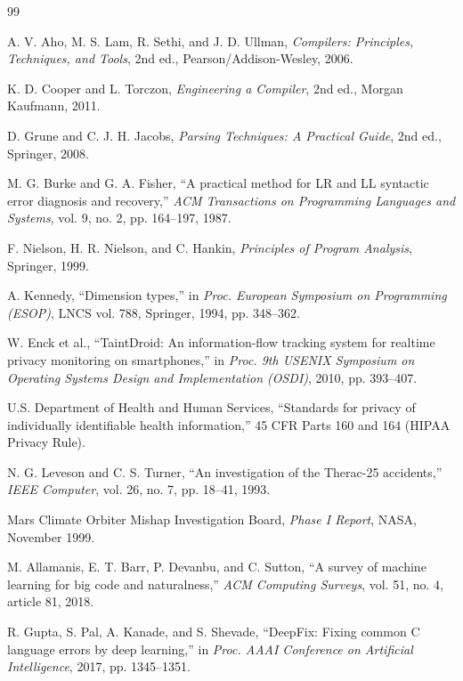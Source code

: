 \documentclass[12pt,a4paper]{article}
\begin{document}
\small
\begin{thebibliography}{99}
\setlength{\itemsep}{1pt}

A. V. Aho, M. S. Lam, R. Sethi, and J. D. Ullman,
\textit{Compilers: Principles, Techniques, and Tools},
2nd ed., Pearson/Addison-Wesley, 2006.

K. D. Cooper and L. Torczon,
\textit{Engineering a Compiler},
2nd ed., Morgan Kaufmann, 2011.

D. Grune and C. J. H. Jacobs,
\textit{Parsing Techniques: A Practical Guide},
2nd ed., Springer, 2008.

M. G. Burke and G. A. Fisher,
``A practical method for LR and LL syntactic error diagnosis and recovery,''
\textit{ACM Transactions on Programming Languages and Systems}, vol. 9, no. 2, pp. 164--197, 1987.

F. Nielson, H. R. Nielson, and C. Hankin,
\textit{Principles of Program Analysis},
Springer, 1999.

A. Kennedy,
``Dimension types,''
in \textit{Proc. European Symposium on Programming (ESOP)}, LNCS vol. 788, Springer, 1994, pp. 348--362.

W. Enck et al.,
``TaintDroid: An information-flow tracking system for realtime privacy monitoring on smartphones,''
in \textit{Proc. 9th USENIX Symposium on Operating Systems Design and Implementation (OSDI)}, 2010, pp. 393--407.

U.S. Department of Health and Human Services,
``Standards for privacy of individually identifiable health information,''
45 CFR Parts 160 and 164 (HIPAA Privacy Rule).

N. G. Leveson and C. S. Turner,
``An investigation of the Therac-25 accidents,''
\textit{IEEE Computer}, vol. 26, no. 7, pp. 18--41, 1993.

Mars Climate Orbiter Mishap Investigation Board,
\textit{Phase I Report},
NASA, November 1999.

M. Allamanis, E. T. Barr, P. Devanbu, and C. Sutton,
``A survey of machine learning for big code and naturalness,''
\textit{ACM Computing Surveys}, vol. 51, no. 4, article 81, 2018.

R. Gupta, S. Pal, A. Kanade, and S. Shevade,
``DeepFix: Fixing common C language errors by deep learning,''
in \textit{Proc. AAAI Conference on Artificial Intelligence}, 2017, pp. 1345--1351.


\end{thebibliography}
\end{document}
